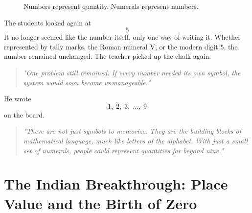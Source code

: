 \documentclass[11pt]{article}
\begin{document}
\begin{figure}[ht]
\centering


\caption{ Numbers represent quantity. Numerals represent numbers.
}

\label{fig:numbertonumeral}

\end{figure}
The students looked again at
\[5\]
It no longer seemed like the number itself, only one way of writing it. Whether represented by tally marks, the Roman numeral \(\mathrm{V}\), or the modern digit \(5\), the number remained unchanged.
The teacher picked up the chalk again.
\begin{quote}
\emph{"One problem still remained. If every number needed its own symbol, the system would soon become unmanageable."}
\end{quote}
He wrote \[ 1,\;2,\;3,\;\ldots,\;9 \] on the board.
\begin{quote}
\emph{"These are not just symbols to memorize. They are the building blocks of mathematical language, much like letters of the alphabet. With just a small set of numerals, people could represent quantities far beyond nine."}
\end{quote}

\section*{\textcolor{indianmathgold}{The Indian Breakthrough: Place Value and the Birth of Zero}}
\end{document}
